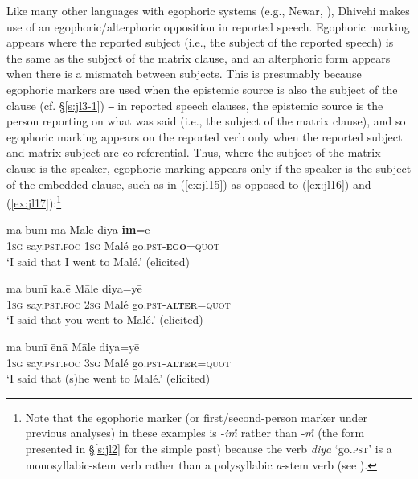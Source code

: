 \documentclass[output=paper]{langsci/langscibook}
\begin{document}
Like many other languages with egophoric systems (e.g., Newar, \citealt{Hale1980}), Dhivehi makes use of an egophoric/alterphoric opposition in reported speech. Egophoric marking appears where the reported subject (i.e., the subject of the reported speech) is the same as the subject of the matrix clause, and an alterphoric form appears when there is a mismatch between subjects. This is presumably because egophoric markers are used when the epistemic source is also the subject of the clause (cf. §\ref{s:jl3-1}) ‒ in reported speech clauses, the epistemic source is the person reporting on what was said (i.e., the subject of the matrix clause), and so egophoric marking appears on the reported verb only when the reported subject and matrix subject are co-referential. Thus, where the subject of the matrix clause is the speaker, egophoric marking appears only if the speaker is the subject of the embedded clause, such as in (\ref{ex:jl15}) as opposed to (\ref{ex:jl16}) and (\ref{ex:jl17}):\footnote{Note that the egophoric marker (or first/second-person marker under previous analyses) in these examples is ‑\textit{im̊} rather than ‑\textit{m̊} (the form presented in §\ref{s:jl2} for the simple past) because the verb \textit{diya} ‘go.\textsc{pst}’ is a monosyllabic-stem verb rather than a polysyllabic \textit{a}-stem verb (see \citealt[145--146]{Gnanadesikan2017}).}

\begin{exe}
	\ex 	\label{ex:jl15}
	\gll ma bunī ma Māle diya-\textbf{im}=ē\\
	1\textsc{sg} say.\textsc{pst}.\textsc{foc} 1\textsc{sg} Malé go.\textsc{pst}-\textbf{\textsc{ego}}=\textsc{quot}\\
	\trans ‘I said that I went to Malé.’ (elicited)
\end{exe}

\begin{exe}
	\ex 	\label{ex:jl16}
	\gll ma bunī kalē Māle diya=yē\\
	1\textsc{sg} say.\textsc{pst}.\textsc{foc} 2\textsc{sg} Malé go.\textsc{pst}-\textbf{\textsc{alter}}=\textsc{quot}\\
	\trans ‘I said that you went to Malé.’ (elicited)
\end{exe}

\begin{exe}
	\ex 	\label{ex:jl17}
	\gll ma bunī ēnā Māle diya=yē\\
	1\textsc{sg} say.\textsc{pst}.\textsc{foc} 3\textsc{sg} Malé go.\textsc{pst}-\textbf{\textsc{alter}}=\textsc{quot}\\
	\trans ‘I said that (s)he went to Malé.’ (elicited)
\end{exe}
\end{document}
